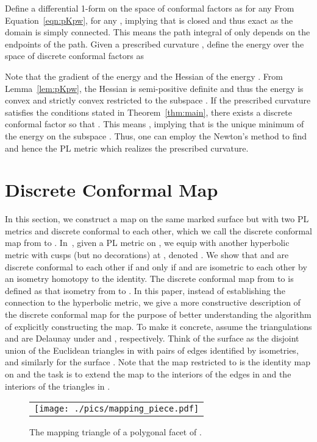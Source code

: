 \documentclass[11pt]{article}
\begin{document}
Define a differential 1-form on the space of conformal factors as 
 for any 
From Equation~\eqref{eqn:pKpw},  for 
any , implying that  is closed and thus exact as the domain   is simply connected. 
This means the path integral of  only depends on the endpoints of the path. Given a prescribed curvature 
, define the energy  over the space of discrete conformal factors as 

Note that the gradient of the energy  and 
the Hessian of the energy . From Lemma~\ref{lem:pKpw}, the Hessian 
 is semi-positive definite and thus the energy  is convex and strictly convex restricted to the subspace 
. If the prescribed curvature  satisfies the conditions
stated in Theorem~\ref{thm:main}, there exists a discrete conformal factor  so that . 
This means , implying that  is the unique minimum of the energy  on the subspace .
Thus, one can employ the Newton's method to find  and hence the PL metric  which realizes the 
prescribed curvature. 

\section{Discrete Conformal Map}
\label{sec:disconf-map}
In this section, we construct a map  on the same marked 
surface  but with two PL metrics  and  discrete conformal to each other, which
we call the discrete conformal map from  to . 
In~\cite{glsw2}, given a PL metric  on ,  we equip  with another hyperbolic metric 
with cusps (but no decorations) at , denoted . We show that  and  are discrete conformal 
to each other if and only if  and  are isometric to each other by an isometry homotopy to the identity. 
The discrete conformal map  from  to  is defined as that isometry from  to . 
In this paper, instead of establishing the connection to the hyperbolic metric, we give a more constructive 
description of the discrete conformal map for the purpose of better understanding the algorithm of 
explicitly constructing the map. To make it concrete, assume the triangulations
 and  are Delaunay under  and , respectively. Think of the 
surface  as the disjoint union of the Euclidean triangles in   with pairs of 
edges identified by isometries, and similarly for the surface . 
Note that the map  restricted to  is the identity map on  and the task is to extend 
the map to the interiors of the edges in  and the interiors of the triangles in . 

\begin{figure}[t]
\begin{center}
\begin{tabular}{c}
\texttt{[image: ./pics/mapping\_piece.pdf]}
\end{tabular}
\vspace{-0.1in}
\end{center}
\caption{The mapping triangle of a polygonal facet of . 
\label{fig:mapping_piece}}
\end{figure}
\end{document}
